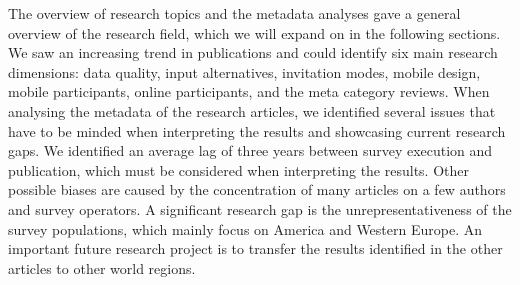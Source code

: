 The overview of research topics and the metadata analyses gave a general overview of the research field, which we will expand on in the following sections. We saw an increasing trend in publications and could identify six main research dimensions: data quality, input alternatives, invitation modes, mobile design, mobile participants, online participants, and the meta category reviews. When analysing the metadata of the research articles, we identified several issues that have to be minded when interpreting the results and showcasing current research gaps. We identified an average lag of three years between survey execution and publication, which must be considered when interpreting the results. Other possible biases are caused by the concentration of many articles on a few authors and survey operators. A significant research gap is the unrepresentativeness of the survey populations, which mainly focus on America and Western Europe. An important future research project is to transfer the results identified in the other articles to other world regions. 

